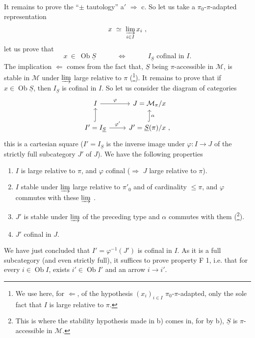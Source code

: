 \documentclass[11pt]{article}
\newcommand{\msp}[1]{\marginpar{\footnotesize [#1]}}
\newcommand{\uS}{\underline{S}}
\newcommand{\Ob}{\operatorname{Ob}}
\begin{document}
It remains to prove the ``$\pm$ tautology'' a$'$ $\Longrightarrow$ c. So let us take a $\pi_0$-$\pi$-adapted representation
\[
x \ \simeq \ \varinjlim_{i\in I} x_i \ ,
\]
let us prove that
\[
x \ \in \ \Ob\uS \qquad\quad \Longleftrightarrow \qquad\quad I_{\uS} \text{ cofinal in } I.
\]
The implication $\Longleftarrow$ comes from the fact that, $\uS$ being $\pi$-accessible in $\mathcal{M}$, is stable in $\mathcal{M}$ under $\varinjlim$ large relative to $\pi$ (\footnote[137]{We use here, for $\Longleftarrow$, of the hypothesis $(x_i)_{i\in I}$ $\pi_0$-$\pi$-adapted, only the sole fact that $I$ is large relative to $\pi$.}). It remains to prove\msp{page 312} that if $x \in \Ob\uS$, then $I_{\uS}$ is cofinal in $I$. So let us consider the diagram of categories
\[
\begin{tikzcd}
I \arrow[r, "\varphi"] & J = \mathcal{M}_\pi/x \\
I' = I_{\uS} \arrow[u, hook] \arrow[r, "\varphi'"] & J' = \uS(\pi)/x \ , \arrow[u, hook, "\alpha"']
\end{tikzcd}
\]
this is a cartesian square ($I' = I_{\uS}$ is the inverse image under $\varphi : I \longrightarrow J$ of the strictly full subcategory $J'$ of $J$). We have the following properties
\begin{enumerate}
\item[1)] $I$ is large relative to $\pi$, and $\varphi$ cofinal ($\Longrightarrow$ $J$ large relative to $\pi$).
\item[2)] $I$ stable under $\varinjlim$ large relative to $\pi'_0$ and of cardinality $\leqslant \pi$, and $\varphi$ commutes with these $\varinjlim$ .
\item[3)] $J'$ is stable under $\varinjlim$ of the preceding type and $\alpha$ commutes with them (\footnote[138]{This is where the stability hypothesis made in b) comes in, for by b), $\uS$ is $\pi$-accessible in $\mathcal{M}$.}).
\item[4)] $J'$ cofinal in $J$.
\end{enumerate}
\noindent We have just concluded that $I' = \varphi^{-1}(J')$\msp{page 313} is cofinal in $I$. As it is a full subcategory (and even strictly full), it suffices to prove property F 1, i.e. that for every $i \in \Ob I$, exists $i' \in \Ob I'$ and an arrow $i \longrightarrow i'$.
\end{document}

